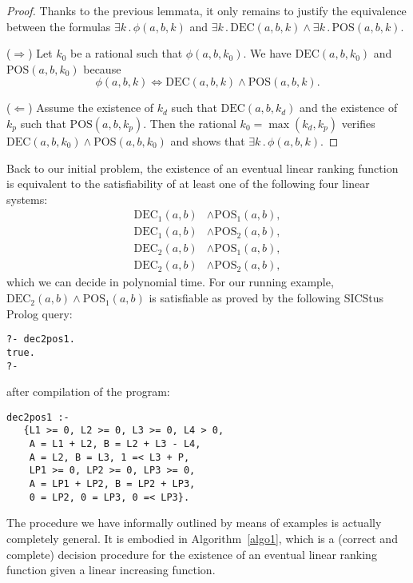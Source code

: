 \documentclass{acm_proc_article-sp}
\newcommand{\st}{\mathrel{.}}
\newcommand{\dec}{\mathrm{DEC}}
\newcommand{\pos}{\mathrm{POS}}
\begin{document}
\begin{proof}
Thanks to the previous lemmata, it only remains to justify the equivalence
between the formulas $\exists k \st \phi(a, b, k)$
and $\exists k \st \dec(a, b, k) \land \exists k \st \pos(a, b, k)$.

($\Longrightarrow$) Let $k_0$ be a rational such that $\phi(a, b, k_0)$.
We have $\dec(a, b, k_0)$ and $\pos(a, b, k_0)$ because
\[
  \phi(a, b, k) \iff \dec(a, b, k) \land \pos(a, b, k).
\]

($\Longleftarrow$) Assume the existence of $k_d$
such that  $\dec(a, b, k_d)$ and the existence of $k_p$
such that $\pos(a, b, k_p)$.
Then the rational $k_0 = \max(k_d, k_p)$
verifies $\dec(a, b, k_0) \land \pos(a, b, k_0)$
and shows that $\exists k \st \phi(a, b, k)$.
\end{proof}

Back to our initial problem, the existence of an eventual linear
ranking function is equivalent to the satisfiability of at least one
of the following four linear systems:
\begin{align*}
  \dec_1(a, b) &\land \pos_1(a, b), \\
  \dec_1(a, b) &\land \pos_2(a, b), \\
  \dec_2(a, b) &\land \pos_1(a, b), \\
  \dec_2(a, b) &\land \pos_2(a, b),
\end{align*}
which we can decide in polynomial time.
For our running example,
$\dec_2(a, b) \land \pos_1(a, b)$ is satisfiable
as proved by the following SICStus Prolog query:
\begin{verbatim}
?- dec2pos1.
true.
?-
\end{verbatim}
after compilation of the program:
\begin{verbatim}
dec2pos1 :-
   {L1 >= 0, L2 >= 0, L3 >= 0, L4 > 0,
    A = L1 + L2, B = L2 + L3 - L4,
    A = L2, B = L3, 1 =< L3 + P,
    LP1 >= 0, LP2 >= 0, LP3 >= 0,
    A = LP1 + LP2, B = LP2 + LP3,
    0 = LP2, 0 = LP3, 0 =< LP3}.
\end{verbatim}

The procedure we have informally outlined by means of examples is
actually completely general.
It is embodied in Algorithm~\ref{algo1}, which is a (correct and
complete) decision procedure for the existence of an eventual
linear ranking function given a linear increasing function.
\end{document}
